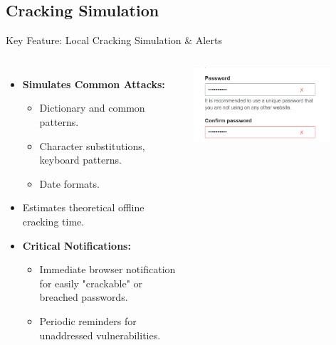 \documentclass[aspectratio=169]{beamer}
\begin{document}
\subsection{Cracking Simulation}
\begin{frame}{Key Feature: Local Cracking Simulation \& Alerts}
  \begin{columns}
      \begin{itemize}
        \item \textbf{Simulates Common Attacks:}
        \begin{itemize}
          \item Dictionary and common patterns.
          \item Character substitutions, keyboard patterns.
          \item Date formats.
        \end{itemize}
        \item Estimates theoretical offline cracking time.
        \item \textbf{Critical Notifications:}
        \begin{itemize}
           \item Immediate browser notification for easily "crackable" or breached passwords.
           \item Periodic reminders for unaddressed vulnerabilities.
        \end{itemize}
     \end{itemize}
      \centering
      \includegraphics[width=0.8\textwidth]{red.png}
  \end{columns}
\end{frame}
\end{document}
